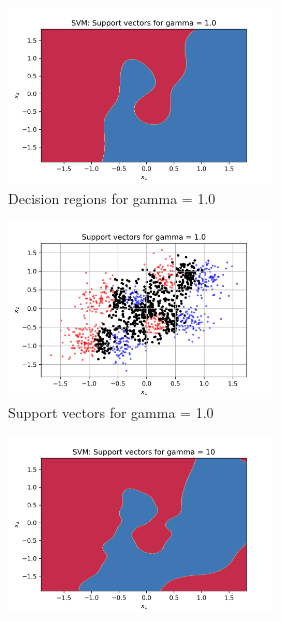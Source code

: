 \documentclass[a4paper]{article}    %
\begin{document}
\begin{figure}[H]
\begin{subfigure}{0.45\textwidth}
        \centering
        \includegraphics[width=7cm]{decision_region_gamma_1}
        \caption{Decision regions for gamma = 1.0}
        \label{fig:svm-decision_region_gamma_1}
    \end{subfigure}
    \hfill
    \begin{subfigure}{0.45\textwidth}
        \centering
        \includegraphics[width=7cm]{support_vectors_gamma_1}
        \caption{Support vectors for gamma = 1.0}
        \label{fig:svm-support_vectors_gamma_1}
    \end{subfigure}
    \begin{subfigure}{0.45\textwidth}
        \centering
        \includegraphics[width=7cm]{decision_region_gamma_10}

\end{subfigure}
\end{figure}
\end{document}
